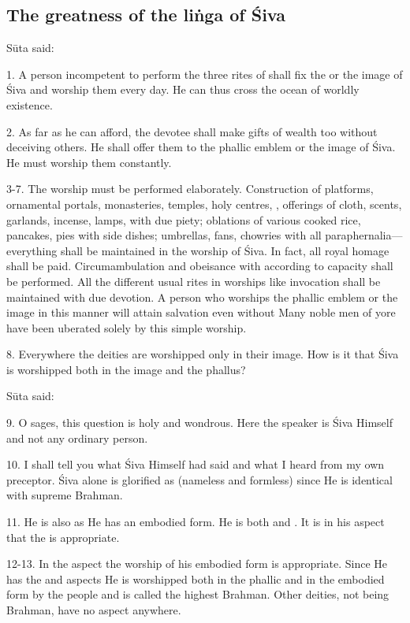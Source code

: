 \subsection{The greatness of the liṅga of Śiva}

Sūta said:

1. A person incompetent to perform the three rites of  \etc shall
fix the  or the image of Śiva and worship them every day. He can thus
cross the ocean of worldly existence.

2. As far as he can afford, the devotee shall make gifts of wealth too without
deceiving others. He shall offer them to the phallic emblem or the image of Śiva.
He must worship them constantly.

3-7. The worship must be performed elaborately. Construction of platforms,
ornamental portals, monasteries, temples, holy centres, \etc, offerings of cloth,
scents, garlands, incense, lamps, with due piety; oblations of various cooked
rice, pancakes, pies \etc with side dishes; umbrellas, fans, chowries with all
paraphernalia—everything shall be maintained in the worship of Śiva. In fact,
all royal homage shall be paid. Circumambulation and obeisance with 
according to capacity shall be performed. All the different usual rites in
worships like invocation shall be maintained with due devotion. A person who
worships the phallic emblem or the image in this manner will attain salvation
even without  \etc Many noble men of yore have been uberated solely
by this simple worship.

8. Everywhere the deities are worshipped only in their image. How is it that
Śiva is worshipped both in the image and the phallus?

Sūta said:

9. O sages, this question is holy and wondrous. Here the speaker is Śiva Himself
and not any ordinary person.

10. I shall tell you what Śiva Himself had said and what I heard from my own
preceptor. Śiva alone is glorified as  (nameless and formless) since
He is identical with supreme Brahman.

11. He is also  as He has an embodied form. He is both 
and . It is in his  aspect that the 
is appropriate.

12-13. In the  aspect the worship of his embodied form is appropriate.
Since He has the  and  aspects He is worshipped both in
the phallic and in the embodied form by the people and is called the highest
Brahman. Other deities, not being Brahman, have no  aspect anywhere.

